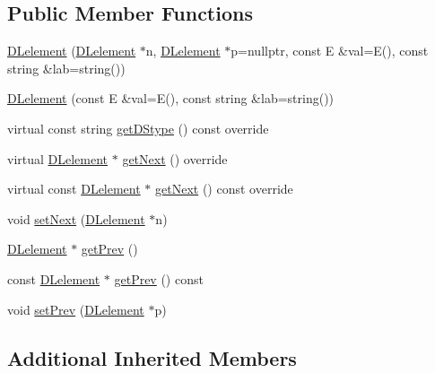 \subsection*{Public Member Functions}
\begin{DoxyCompactItemize}
\item 
\hyperlink{classbridges_1_1datastructure_1_1_d_lelement_a7384d570c355bb4762c98b79d4c1e988}{D\+Lelement} (\hyperlink{classbridges_1_1datastructure_1_1_d_lelement}{D\+Lelement} $\ast$n, \hyperlink{classbridges_1_1datastructure_1_1_d_lelement}{D\+Lelement} $\ast$p=nullptr, const E \&val=E(), const string \&lab=string())
\item 
\hyperlink{classbridges_1_1datastructure_1_1_d_lelement_af9c0dc9b417de0466a47be904cd845f6}{D\+Lelement} (const E \&val=E(), const string \&lab=string())
\item 
virtual const string \hyperlink{classbridges_1_1datastructure_1_1_d_lelement_a736ba8e6901608fb0ab04d781d2cceee}{get\+D\+Stype} () const override
\item 
virtual \hyperlink{classbridges_1_1datastructure_1_1_d_lelement}{D\+Lelement} $\ast$ \hyperlink{classbridges_1_1datastructure_1_1_d_lelement_a63212051ea77d74bd751dea00288d2be}{get\+Next} () override
\item 
virtual const \hyperlink{classbridges_1_1datastructure_1_1_d_lelement}{D\+Lelement} $\ast$ \hyperlink{classbridges_1_1datastructure_1_1_d_lelement_a8599e5be5fc1771d4e8a40f6de67b4a7}{get\+Next} () const override
\item 
void \hyperlink{classbridges_1_1datastructure_1_1_d_lelement_ab0fe212dd0e3795b8f3f7978c6bdf805}{set\+Next} (\hyperlink{classbridges_1_1datastructure_1_1_d_lelement}{D\+Lelement} $\ast$n)
\item 
\hyperlink{classbridges_1_1datastructure_1_1_d_lelement}{D\+Lelement} $\ast$ \hyperlink{classbridges_1_1datastructure_1_1_d_lelement_ac0b2dd38b3e3acee503152c9aa88f61c}{get\+Prev} ()
\item 
const \hyperlink{classbridges_1_1datastructure_1_1_d_lelement}{D\+Lelement} $\ast$ \hyperlink{classbridges_1_1datastructure_1_1_d_lelement_a36120fa524459af75f7e8c1ae379ae20}{get\+Prev} () const
\item 
void \hyperlink{classbridges_1_1datastructure_1_1_d_lelement_a4bada3a954b68d2c4169b27b5b64ca97}{set\+Prev} (\hyperlink{classbridges_1_1datastructure_1_1_d_lelement}{D\+Lelement} $\ast$p)
\end{DoxyCompactItemize}
\subsection*{Additional Inherited Members}


